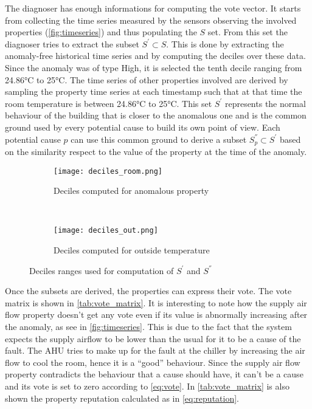 The diagnoser has enough informations for computing the vote vector. It starts from collecting the time series measured by the sensors observing the involved properties (\autoref{fig:timeseries}) and thus populating the $S$ set.
From this set the diagnoser tries to extract the subset $S^{'}\subset S$. This is done by extracting the anomaly-free historical time series and by computing the deciles over these data. Since the anomaly was of type High, it is selected the tenth decile ranging from \ang{24.86}C to \ang{25}C. The time series of other properties involved are derived by sampling the property time series at each timestamp such that at that time the room temperature is between \ang{24.86}C to \ang{25}C. This set $S^{'}$ represents the normal behaviour of the building that is closer to the anomalous one and is the common ground used by every potential cause to build its own point of view. Each potential cause $p$ can use this common ground to derive a subset $S_p^{''}\subset S^{'}$ based on the similarity respect to the value of the property at the time of the anomaly.
\begin{figure}
  \begin{subfigure}[b]{.5\textwidth}
    \centering
      \texttt{[image: deciles\_room.png]}
      \caption{Deciles computed for anomalous property}
      \label{fig:room_deciles}
  \end{subfigure}
  ~
  \begin{subfigure}[b]{.5\textwidth}
    \centering
      \texttt{[image: deciles\_out.png]}
      \caption{Deciles computed for outside temperature}
      \label{fig:out_deciles}
  \end{subfigure}
  \caption{Deciles ranges used for computation of $S^{'}$ and $S^{''}$}
  \label{fig:deciles}
\end{figure}
Once the subsets are derived, the properties can express their vote.
The vote matrix is shown in \autoref{tab:vote_matrix}. It is interesting to note how the supply air flow property doesn't get any vote even if its value is abnormally increasing after the anomaly, as see in \autoref{fig:timeseries}. This is due to the fact that the system expects the supply airflow to be lower than the usual for it to be a cause of the fault. The AHU tries to make up for the fault at the chiller by increasing the air flow to cool the room, hence it is a ``good'' behaviour. Since the supply air flow property contradicts the behaviour that a cause should have, it can't be a cause and its vote is set to zero according to \autoref{eq:vote}. In \autoref{tab:vote_matrix} is also shown the property reputation calculated as in \autoref{eq:reputation}.
